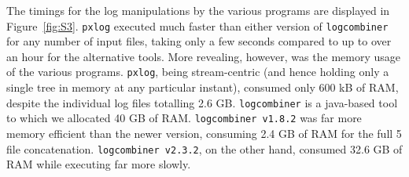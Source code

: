 \documentclass{article}
\begin{document}
The timings for the log manipulations by the various programs are displayed in Figure~\ref{fig:S3}. \texttt{pxlog} executed much faster than either version of \texttt{logcombiner} for any number of input files, taking only a few seconds compared to up to over an hour for the alternative tools. More revealing, however, was the memory usage of the various programs. \texttt{pxlog}, being stream-centric (and hence holding only a single tree in memory at any particular instant), consumed only 600 kB of RAM, despite the individual log files totalling 2.6 GB. \texttt{logcombiner} is a java-based tool to which we allocated 40 GB of RAM. \texttt{logcombiner v1.8.2} was far more memory efficient than the newer version, consuming 2.4 GB of RAM for the full 5 file concatenation. \texttt{logcombiner v2.3.2}, on the other hand, consumed 32.6 GB of RAM while executing far more slowly.

%
%
%
%
%
%
%

\end{document}
